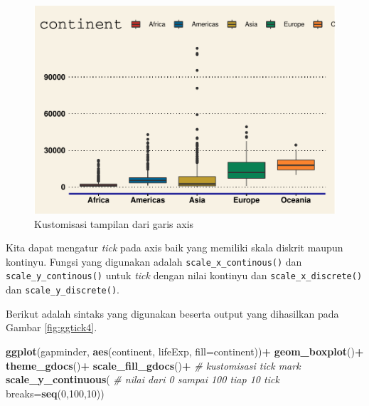 \documentclass[]{book}
\newenvironment{Shaded}{\begin{snugshade}}{\end{snugshade}}
\newcommand{\KeywordTok}[1]{\textcolor[rgb]{0.13,0.29,0.53}{\textbf{#1}}}
\newcommand{\DataTypeTok}[1]{\textcolor[rgb]{0.13,0.29,0.53}{#1}}
\newcommand{\DecValTok}[1]{\textcolor[rgb]{0.00,0.00,0.81}{#1}}
\newcommand{\StringTok}[1]{\textcolor[rgb]{0.31,0.60,0.02}{#1}}
\newcommand{\CommentTok}[1]{\textcolor[rgb]{0.56,0.35,0.01}{\textit{#1}}}
\newcommand{\OperatorTok}[1]{\textcolor[rgb]{0.81,0.36,0.00}{\textbf{#1}}}
\newcommand{\NormalTok}[1]{#1}
\begin{document}
\begin{figure}

{\centering \includegraphics[width=0.7\linewidth]{EnvStat_files/figure-latex/ggtick3-1} 

}

\caption{Kustomisasi tampilan dari garis axis}\label{fig:ggtick3}
\end{figure}

Kita dapat mengatur \emph{tick} pada axis baik yang memiliki skala
diskrit maupun kontinyu. Fungsi yang digunakan adalah
\texttt{scale\_x\_continous()} dan \texttt{scale\_y\_continous()} untuk
\emph{tick} dengan nilai kontinyu dan \texttt{scale\_x\_discrete()} dan
\texttt{scale\_y\_discrete()}.

Berikut adalah sintaks yang digunakan beserta output yang dihasilkan
pada Gambar \ref{fig:ggtick4}.

\begin{Shaded}
\begin{Highlighting}[]
\KeywordTok{ggplot}\NormalTok{(gapminder, }\KeywordTok{aes}\NormalTok{(continent, lifeExp,}
                      \DataTypeTok{fill=}\NormalTok{continent))}\OperatorTok{+}
\StringTok{  }\KeywordTok{geom_boxplot}\NormalTok{()}\OperatorTok{+}
\StringTok{  }\KeywordTok{theme_gdocs}\NormalTok{()}\OperatorTok{+}
\StringTok{  }\KeywordTok{scale_fill_gdocs}\NormalTok{()}\OperatorTok{+}
\StringTok{  }\CommentTok{# kustomisasi tick mark}
\StringTok{  }\KeywordTok{scale_y_continuous}\NormalTok{(}
    \CommentTok{# nilai dari 0 sampai 100 tiap 10 tick}
    \DataTypeTok{breaks=}\KeywordTok{seq}\NormalTok{(}\DecValTok{0}\NormalTok{,}\DecValTok{100}\NormalTok{,}\DecValTok{10}\NormalTok{))}
\end{Highlighting}
\end{Shaded}
\end{document}
